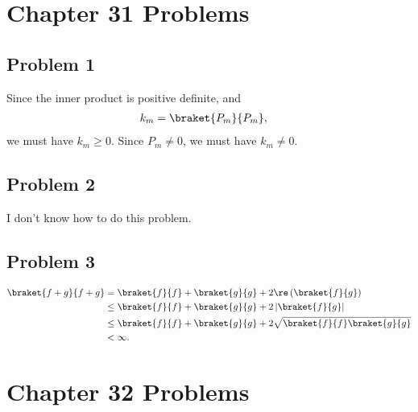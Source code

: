 \documentclass[10pt]{mypackage}
\begin{document}
\RaggedRight
\section{Chapter 31 Problems}%
\subsection{Problem 1}%
Since the inner product is positive definite, and
\begin{align*}
  k_{m} &= \braket{P_m}{P_m},
\end{align*}
we must have $k_m \geq 0$. Since $P_m\neq 0$, we must have $k_m \neq 0$.
\subsection{Problem 2}%
I don't know how to do this problem.
\subsection{Problem 3}%
\begin{align*}
  \braket{f+g}{f+g} &= \braket{f}{f} + \braket{g}{g} + 2\re\left(\braket{f}{g}\right)\\
                    &\leq \braket{f}{f} + \braket{g}{g} + 2\left\vert \braket{f}{g} \right\vert\\
                    &\leq \braket{f}{f} + \braket{g}{g} + 2\sqrt{\braket{f}{f}\braket{g}{g}}\\
                    &< \infty.
\end{align*}
\section{Chapter 32 Problems}%
\end{document}
